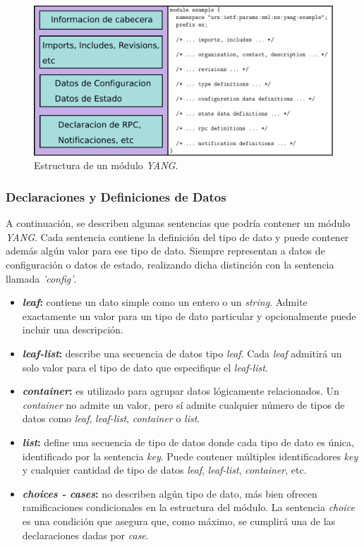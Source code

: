   \begin{figure}[H]
	\centering
	\includegraphics[scale=0.5]{Figures/estructura_modulo.pdf}
	\caption{Estructura de un módulo \textit{YANG}.}
	\label{fig:estructura_modulo}
  \end{figure}

  \subsubsection{Declaraciones y Definiciones de Datos}
  A continuación, se describen algunas sentencias que podría contener un módulo \textit{YANG}. Cada sentencia contiene la definición del tipo de dato y puede contener además algún valor para ese tipo de dato. Siempre representan a datos de configuración o datos de estado, realizando dicha distinción con la sentencia llamada \textit{'config'}.  

  \begin{itemize}
	\item \textbf{\textit{leaf}:} contiene un dato simple como un entero o un \textit{string}. Admite exactamente un valor para un tipo de dato particular y opcionalmente puede incluir una descripción. 
	\item \textbf{\textit{leaf-list}:} describe una secuencia de datos tipo \textit{leaf}. Cada \textit{leaf} admitirá un solo valor para el tipo de dato que especifique el \textit{leaf-list}.
	\item \textbf{\textit{container}:} es utilizado para agrupar datos lógicamente relacionados. Un \textit{container} no admite un valor, pero sí admite cualquier número de tipos de datos como \textit{leaf}, \textit{leaf-list}, \textit{container} o \textit{list}.
	\item \textbf{\textit{list}:} define una secuencia de tipo de datos donde cada tipo de dato es única, identificado por la sentencia \textit{key}. Puede contener múltiples identificadores \textit{key} y cualquier cantidad de tipo de datos \textit{leaf}, \textit{leaf-list}, \textit{container}, etc.
	\item \textbf{\textit{choices - cases}:} no describen algún tipo de dato, más bien ofrecen ramificaciones condicionales en la estructura del módulo. La sentencia \textit{choice} es una condición que asegura que, como máximo, se cumplirá una de las declaraciones dadas por \textit{case}.
\end{itemize}

